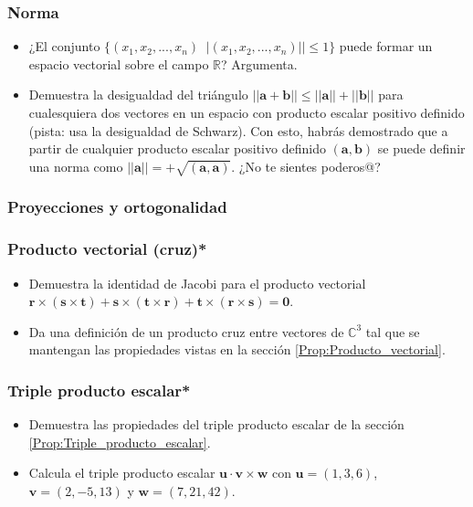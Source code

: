 \documentclass[12pt]{article}
\begin{document}
\subsubsection{Norma} \label{Ejer:Norma}

\begin{itemize}
\item ¿El conjunto $\{(x_1,x_2,...,x_n)\mathop|\mathop x_i\in\mathbb{R} \land ||(x_1,x_2,...,x_n)||\leq1\}$ puede formar un espacio vectorial sobre el campo $\mathbb{R}$? Argumenta.
\item Demuestra la desigualdad del triángulo $||\mathbf{a}+\mathbf{b}|| \leq ||\mathbf{a}||+||\mathbf{b}||$ para cualesquiera dos vectores en un espacio con producto escalar positivo definido (pista: usa la desigualdad de Schwarz). Con esto, habrás demostrado que a partir de cualquier producto escalar positivo definido $(\mathbf{a},\mathbf{b})$ se puede definir una norma como $||\mathbf{a}|| = +\sqrt{(\mathbf{a},\mathbf{a})}$. ¿No te sientes poderos@?
\end{itemize}


\subsubsection{Proyecciones y ortogonalidad}


\subsubsection{Producto vectorial (cruz)*}

\begin{itemize}
    \item Demuestra la identidad de Jacobi para el producto vectorial $\mathbf{r}\times(\mathbf{s}\times\mathbf{t})+\mathbf{s}\times(\mathbf{t}\times\mathbf{r})+\mathbf{t}\times(\mathbf{r}\times\mathbf{s}) = \mathbf{0}$.
    \item Da una definición de un producto cruz entre vectores de $\mathbb{C}^3$ tal que se mantengan las propiedades vistas en la sección \ref{Prop:Producto_vectorial}.
\end{itemize}{}

\subsubsection{Triple producto escalar*}

\begin{itemize}
    \item Demuestra las propiedades del triple producto escalar de la sección \ref{Prop:Triple_producto_escalar}.
    \item Calcula el triple producto escalar $\mathbf{u}\cdot\mathbf{v}\times\mathbf{w}$ con $\mathbf{u} = (1,3,6)$, $\mathbf{v}=(2,-5,13)$ y $\mathbf{w}=(7,21,42)$.
\end{itemize}{}
\end{document}
